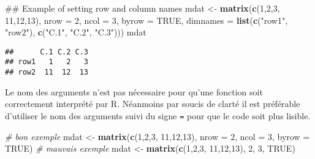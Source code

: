 \documentclass[]{book}
\newenvironment{Shaded}{\begin{snugshade}}{\end{snugshade}}
\newcommand{\KeywordTok}[1]{\textcolor[rgb]{0.13,0.29,0.53}{\textbf{#1}}}
\newcommand{\DataTypeTok}[1]{\textcolor[rgb]{0.13,0.29,0.53}{#1}}
\newcommand{\DecValTok}[1]{\textcolor[rgb]{0.00,0.00,0.81}{#1}}
\newcommand{\StringTok}[1]{\textcolor[rgb]{0.31,0.60,0.02}{#1}}
\newcommand{\CommentTok}[1]{\textcolor[rgb]{0.56,0.35,0.01}{\textit{#1}}}
\newcommand{\OtherTok}[1]{\textcolor[rgb]{0.56,0.35,0.01}{#1}}
\newcommand{\NormalTok}[1]{#1}
\theoremstyle{definition}
\theoremstyle{definition}
\theoremstyle{definition}
\theoremstyle{remark}
\begin{document}
\begin{Shaded}
\begin{Highlighting}[]
\NormalTok{## Example of setting row and column names}
\NormalTok{mdat <-}\StringTok{ }\KeywordTok{matrix}\NormalTok{(}\KeywordTok{c}\NormalTok{(}\DecValTok{1}\NormalTok{,}\DecValTok{2}\NormalTok{,}\DecValTok{3}\NormalTok{, }\DecValTok{11}\NormalTok{,}\DecValTok{12}\NormalTok{,}\DecValTok{13}\NormalTok{), }\DataTypeTok{nrow =} \DecValTok{2}\NormalTok{, }\DataTypeTok{ncol =} \DecValTok{3}\NormalTok{, }\DataTypeTok{byrow =} \OtherTok{TRUE}\NormalTok{,}
               \DataTypeTok{dimnames =} \KeywordTok{list}\NormalTok{(}\KeywordTok{c}\NormalTok{(}\StringTok{"row1"}\NormalTok{, }\StringTok{"row2"}\NormalTok{),}
                               \KeywordTok{c}\NormalTok{(}\StringTok{"C.1"}\NormalTok{, }\StringTok{"C.2"}\NormalTok{, }\StringTok{"C.3"}\NormalTok{)))}
\NormalTok{mdat}
\end{Highlighting}
\end{Shaded}

\begin{verbatim}
##      C.1 C.2 C.3
## row1   1   2   3
## row2  11  12  13
\end{verbatim}

Le nom des arguments n'est pas nécessaire pour qu'une fonction soit
correctement interprété par R. Néanmoins par soucis de clarté il est
préférable d'utiliser le nom des arguments suivi du signe \texttt{=}
pour que le code soit plus lisible.

\begin{Shaded}
\begin{Highlighting}[]
\CommentTok{# bon exemple}
\NormalTok{mdat <-}\StringTok{ }\KeywordTok{matrix}\NormalTok{(}\KeywordTok{c}\NormalTok{(}\DecValTok{1}\NormalTok{,}\DecValTok{2}\NormalTok{,}\DecValTok{3}\NormalTok{, }\DecValTok{11}\NormalTok{,}\DecValTok{12}\NormalTok{,}\DecValTok{13}\NormalTok{), }\DataTypeTok{nrow =} \DecValTok{2}\NormalTok{, }\DataTypeTok{ncol =} \DecValTok{3}\NormalTok{, }\DataTypeTok{byrow =} \OtherTok{TRUE}\NormalTok{)}
\CommentTok{# mauvais exemple}
\NormalTok{mdat <-}\StringTok{ }\KeywordTok{matrix}\NormalTok{(}\KeywordTok{c}\NormalTok{(}\DecValTok{1}\NormalTok{,}\DecValTok{2}\NormalTok{,}\DecValTok{3}\NormalTok{, }\DecValTok{11}\NormalTok{,}\DecValTok{12}\NormalTok{,}\DecValTok{13}\NormalTok{), }\DecValTok{2}\NormalTok{, }\DecValTok{3}\NormalTok{, }\OtherTok{TRUE}\NormalTok{)}
\end{Highlighting}
\end{Shaded}
\end{document}
